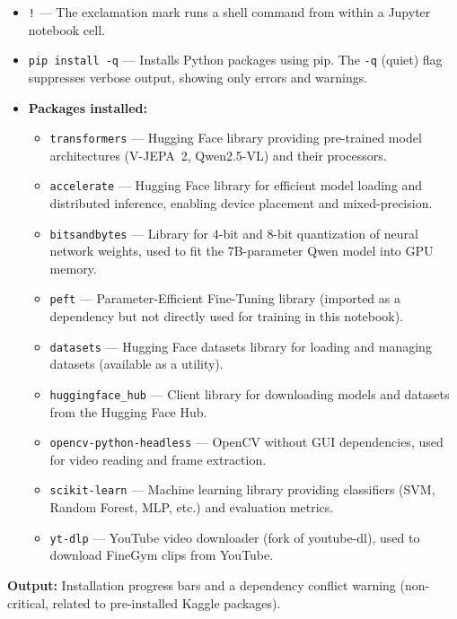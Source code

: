 \begin{explanation}
\begin{itemize}[nosep]
  \item \texttt{!} --- The exclamation mark runs a shell command from within a Jupyter notebook cell.
  \item \texttt{pip install -q} --- Installs Python packages using pip. The \texttt{-q} (quiet) flag suppresses verbose output, showing only errors and warnings.
  \item \textbf{Packages installed:}
  \begin{itemize}[nosep]
    \item \texttt{transformers} --- Hugging Face library providing pre-trained model architectures (V-JEPA~2, Qwen2.5-VL) and their processors.
    \item \texttt{accelerate} --- Hugging Face library for efficient model loading and distributed inference, enabling device placement and mixed-precision.
    \item \texttt{bitsandbytes} --- Library for 4-bit and 8-bit quantization of neural network weights, used to fit the 7B-parameter Qwen model into GPU memory.
    \item \texttt{peft} --- Parameter-Efficient Fine-Tuning library (imported as a dependency but not directly used for training in this notebook).
    \item \texttt{datasets} --- Hugging Face datasets library for loading and managing datasets (available as a utility).
    \item \texttt{huggingface\_hub} --- Client library for downloading models and datasets from the Hugging Face Hub.
    \item \texttt{opencv-python-headless} --- OpenCV without GUI dependencies, used for video reading and frame extraction.
    \item \texttt{scikit-learn} --- Machine learning library providing classifiers (SVM, Random Forest, MLP, etc.) and evaluation metrics.
    \item \texttt{yt-dlp} --- YouTube video downloader (fork of youtube-dl), used to download FineGym clips from YouTube.
  \end{itemize}
\end{itemize}
\end{explanation}

\textbf{Output:} Installation progress bars and a dependency conflict warning (non-critical, related to pre-installed Kaggle packages).

\newpage
